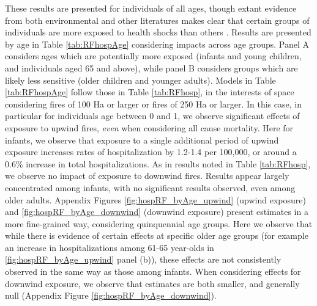\documentclass[11pt]{article}
\begin{document}
\begin{spacing}{1.5}
These results are presented for individuals of all ages, though extant evidence from both environmental and other literatures makes clear that certain groups of individuals are more exposed to health shocks than others \citep{OgasawaraYumitori2019,UNICEF2021,Almondetal2018}.  Results are presented by age in Table \ref{tab:RFhospAge} considering impacts across age groups.  Panel A considers ages which are potentially more exposed (infants and young children, and individuals aged 65 and above), while panel B considers groups which are likely less sensitive (older children and younger adults).  Models in Table \ref{tab:RFhospAge} follow those in Table \ref{tab:RFhosp}, in the interests of space considering fires of 100 Ha or larger or fires of 250 Ha or larger.  In this case, in particular for individuals age between 0 and 1, we observe significant effects of exposure to upwind fires, \emph{even} when considering all cause mortality.  Here for infants, we observe that exposure to a single additional period of upwind exposure increases rates of hospitalization by 1.2-1.4 per 100,000, or around a 0.6\% increase in total hospitalizations. As in results noted in Table \ref{tab:RFhosp}, we observe no impact of exposure to downwind fires.  Results appear largely concentrated among infants, with no significant results observed, even among older adults.  Appendix Figures \ref{fig:hospRF_byAge_upwind} (upwind exposure) and \ref{fig:hospRF_byAge_downwind} (downwind exposure) present estimates in a more fine-grained way, considering quinquennial age groups.  Here we observe that while there is evidence of certain effects at specific older age groups (for example an increase in hospitalizations among 61-65 year-olds in \ref{fig:hospRF_byAge_upwind} panel (b)), these effects are not consistently observed in the same way as those among infants.  When considering effects for downwind exposure, we observe that estimates are both smaller, and generally null (Appendix Figure \ref{fig:hospRF_byAge_downwind}).



\end{spacing}
\end{document}
